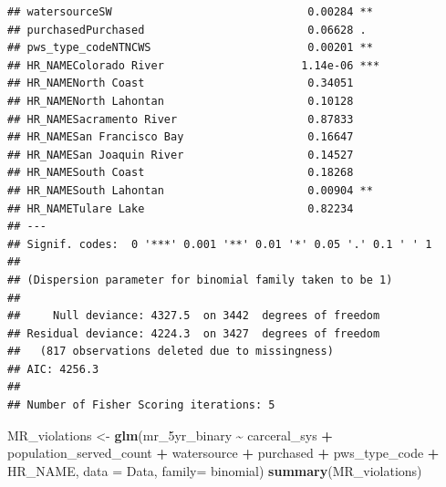 \documentclass[
]{article}
\newenvironment{Shaded}{\begin{snugshade}}{\end{snugshade}}
\newcommand{\AttributeTok}[1]{\textcolor[rgb]{0.13,0.29,0.53}{#1}}
\newcommand{\FunctionTok}[1]{\textcolor[rgb]{0.13,0.29,0.53}{\textbf{#1}}}
\newcommand{\NormalTok}[1]{#1}
\newcommand{\OtherTok}[1]{\textcolor[rgb]{0.56,0.35,0.01}{#1}}
\newcommand{\SpecialCharTok}[1]{\textcolor[rgb]{0.81,0.36,0.00}{\textbf{#1}}}
\begin{document}
\begin{verbatim}
## watersourceSW                              0.00284 ** 
## purchasedPurchased                         0.06628 .  
## pws_type_codeNTNCWS                        0.00201 ** 
## HR_NAMEColorado River                     1.14e-06 ***
## HR_NAMENorth Coast                         0.34051    
## HR_NAMENorth Lahontan                      0.10128    
## HR_NAMESacramento River                    0.87833    
## HR_NAMESan Francisco Bay                   0.16647    
## HR_NAMESan Joaquin River                   0.14527    
## HR_NAMESouth Coast                         0.18268    
## HR_NAMESouth Lahontan                      0.00904 ** 
## HR_NAMETulare Lake                         0.82234    
## ---
## Signif. codes:  0 '***' 0.001 '**' 0.01 '*' 0.05 '.' 0.1 ' ' 1
## 
## (Dispersion parameter for binomial family taken to be 1)
## 
##     Null deviance: 4327.5  on 3442  degrees of freedom
## Residual deviance: 4224.3  on 3427  degrees of freedom
##   (817 observations deleted due to missingness)
## AIC: 4256.3
## 
## Number of Fisher Scoring iterations: 5
\end{verbatim}

\begin{Shaded}
\begin{Highlighting}[]
\NormalTok{MR\_violations }\OtherTok{\textless{}{-}} \FunctionTok{glm}\NormalTok{(mr\_5yr\_binary }\SpecialCharTok{\textasciitilde{}}\NormalTok{ carceral\_sys }\SpecialCharTok{+}\NormalTok{ population\_served\_count }\SpecialCharTok{+}\NormalTok{ watersource }\SpecialCharTok{+}\NormalTok{ purchased }\SpecialCharTok{+}\NormalTok{ pws\_type\_code }\SpecialCharTok{+}\NormalTok{ HR\_NAME, }\AttributeTok{data =}\NormalTok{ Data, }\AttributeTok{family=}\NormalTok{ binomial)}
\FunctionTok{summary}\NormalTok{(MR\_violations)}
\end{Highlighting}
\end{Shaded}
\end{document}

